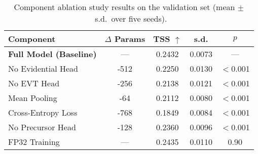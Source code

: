 \begin{table}[htbp]
  \centering
  \caption{Component ablation study results on the validation set
           (mean $\pm$~s.d.\ over five seeds).}
  \label{tab:component_ablation}
  \begin{tabular}{lcccc}
  \toprule
  Component & $\Delta$ Params & TSS $\uparrow$ & s.d. & $p$ \\
  \midrule
  \textbf{Full Model (Baseline)} &        — & 0.2432 & 0.0073 &        — \\
  No Evidential Head        &     -512 & 0.2250 & 0.0130 & $<$0.001 \\
  No EVT Head               &     -256 & 0.2138 & 0.0121 & $<$0.001 \\
  Mean Pooling              &      -64 & 0.2112 & 0.0080 & $<$0.001 \\
  Cross-Entropy Loss        &     -768 & 0.1849 & 0.0084 & $<$0.001 \\
  No Precursor Head         &     -128 & 0.2360 & 0.0096 & $<$0.001 \\
  FP32 Training             &        — & 0.2435 & 0.0110 &     0.90 \\
  \bottomrule
  \end{tabular}
\end{table}